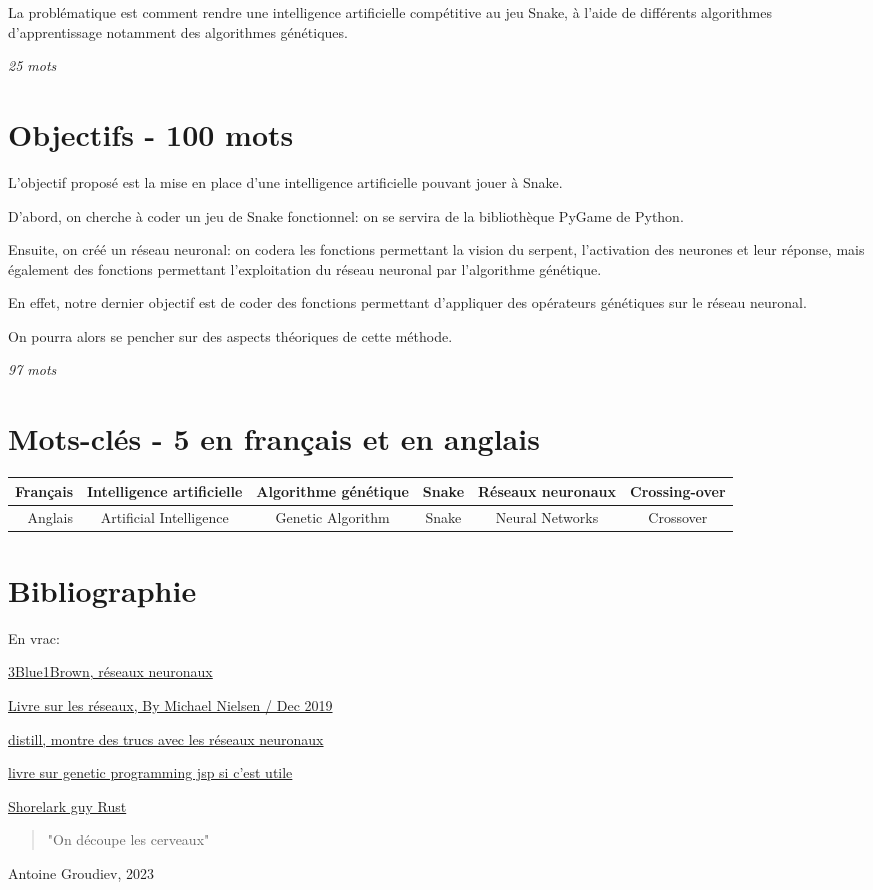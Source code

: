 \documentclass[11pt,a4paper]{article}
\begin{document}
La problématique est comment rendre une intelligence artificielle compétitive au jeu Snake, à l'aide de différents algorithmes d'apprentissage notamment des algorithmes génétiques.

\textit{25 mots}

\section{Objectifs - 100 mots}

L'objectif proposé est la mise en place d'une intelligence artificielle pouvant jouer à Snake.

D'abord, on cherche à coder un jeu de Snake fonctionnel: on se servira de la bibliothèque PyGame de Python.

Ensuite, on créé un réseau neuronal: on codera les fonctions permettant la vision du serpent, l'activation des neurones et leur réponse, mais également des fonctions permettant l'exploitation du réseau neuronal par l'algorithme génétique.

En effet, notre dernier objectif est de coder des fonctions permettant d'appliquer des opérateurs génétiques sur le réseau neuronal.

On pourra alors se pencher sur des aspects théoriques de cette méthode.

\textit{97 mots}

\section{Mots-clés - 5 en français et en anglais}

\begin{tabular}{||r|c|c|c|c|c||} \hline
	Français & Intelligence artificielle & Algorithme génétique & Snake & Réseaux neuronaux & Crossing-over \\ \hline \hline
	Anglais & Artificial Intelligence & Genetic Algorithm & Snake & Neural Networks & Crossover \\
		\hline
	\end{tabular}

\section{Bibliographie}

En vrac:

\href{https://www.3blue1brown.com/topics/neural-networks}{3Blue1Brown, réseaux neuronaux}

\href{http://neuralnetworksanddeeplearning.com/index.html}{Livre sur les réseaux, By Michael Nielsen / Dec 2019}

\href{https://distill.pub}{distill, montre des trucs avec les réseaux neuronaux}

\href{http://www0.cs.ucl.ac.uk/staff/W.Langdon/ftp/papers/poli08_fieldguide.pdf}{livre sur genetic programming jsp si c'est utile}

\href{https://pwy.io/posts/learning-to-fly-pt1/}{Shorelark guy Rust}

\begin{quotation}
  "On découpe les cerveaux"
\end{quotation}
Antoine Groudiev, 2023
\end{document}
